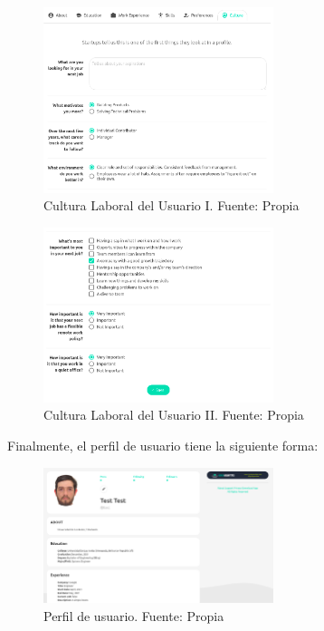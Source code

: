 \begin{figure}[H]
\centering
\includegraphics[width=0.60\textwidth]{img/29.png}
\caption{Cultura Laboral del Usuario I. Fuente: Propia}
\label{figure:usersCulture1}
\end{figure}


\begin{figure}[H]
\centering
\includegraphics[width=0.60\textwidth]{img/30.png}
\caption{Cultura Laboral del Usuario II. Fuente: Propia}
\label{figure:usersCulture2}
\end{figure}

Finalmente, el perfil de usuario tiene la siguiente forma:

\begin{figure}[H]
\centering
\includegraphics[width=0.60\textwidth]{img/31.png}
\caption{Perfil de usuario. Fuente: Propia}
\label{figure:usersProfile}
\end{figure}

